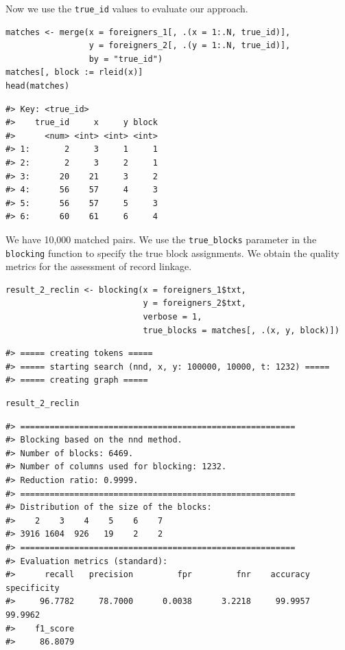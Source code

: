Now we use the \texttt{true\_id} values to evaluate our approach.

\begin{verbatim}
matches <- merge(x = foreigners_1[, .(x = 1:.N, true_id)],
                 y = foreigners_2[, .(y = 1:.N, true_id)],
                 by = "true_id")
matches[, block := rleid(x)]
head(matches)
\end{verbatim}

\begin{verbatim}
#> Key: <true_id>
#>    true_id     x     y block
#>      <num> <int> <int> <int>
#> 1:       2     3     1     1
#> 2:       2     3     2     1
#> 3:      20    21     3     2
#> 4:      56    57     4     3
#> 5:      56    57     5     3
#> 6:      60    61     6     4
\end{verbatim}

We have 10,000 matched pairs. We use the \texttt{true\_blocks} parameter in the \texttt{blocking} function to specify the true block assignments. We obtain the quality metrics for the assessment of record linkage.

\begin{verbatim}
result_2_reclin <- blocking(x = foreigners_1$txt, 
                            y = foreigners_2$txt, 
                            verbose = 1,
                            true_blocks = matches[, .(x, y, block)])
\end{verbatim}

\begin{verbatim}
#> ===== creating tokens =====
#> ===== starting search (nnd, x, y: 100000, 10000, t: 1232) =====
#> ===== creating graph =====
\end{verbatim}

\begin{verbatim}
result_2_reclin
\end{verbatim}

\begin{verbatim}
#> ========================================================
#> Blocking based on the nnd method.
#> Number of blocks: 6469.
#> Number of columns used for blocking: 1232.
#> Reduction ratio: 0.9999.
#> ========================================================
#> Distribution of the size of the blocks:
#>    2    3    4    5    6    7 
#> 3916 1604  926   19    2    2 
#> ========================================================
#> Evaluation metrics (standard):
#>      recall   precision         fpr         fnr    accuracy specificity 
#>     96.7782     78.7000      0.0038      3.2218     99.9957     99.9962 
#>    f1_score 
#>     86.8079
\end{verbatim}

